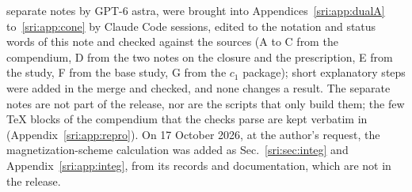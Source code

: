 \begin{itemize}
 separate notes by GPT-6 astra, were brought into Appendices~\ref{sri:app:dualA} to~\ref{sri:app:cone} by Claude Code
 sessions, edited to the notation and status words of this note and checked against the sources (A to C from the
 compendium, D from the two notes on the closure and the prescription, E from the study, F from the base study, G from
 the $c_1$ package); short explanatory steps were added in the merge and checked, and none changes a result. The
 separate notes are not part of the release, nor are the scripts that only build them; the few TeX blocks of the
 compendium that the checks parse are kept verbatim in 
 (Appendix~\ref{sri:app:repro}). On 17 October 2026, at the author's request, the magnetization-scheme calculation was added
 as Sec.~\ref{sri:sec:integ} and Appendix~\ref{sri:app:integ}, from its records and documentation, which are not in the
 release.
\end{itemize}

